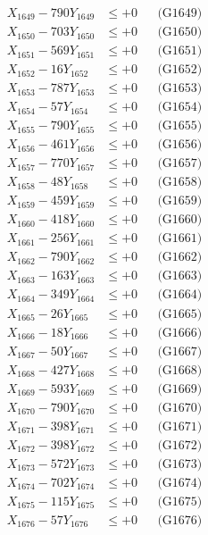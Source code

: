 \documentclass[a4paper,10pt]{article}
\begin{document}
{\begin{align}
X_{1649} - 790Y_{1649} &\leq +0 && \text{(G1649)} \\
X_{1650} - 703Y_{1650} &\leq +0 && \text{(G1650)} \\
\allowbreak
X_{1651} - 569Y_{1651} &\leq +0 && \text{(G1651)} \\
X_{1652} - 16Y_{1652} &\leq +0 && \text{(G1652)} \\
X_{1653} - 787Y_{1653} &\leq +0 && \text{(G1653)} \\
X_{1654} - 57Y_{1654} &\leq +0 && \text{(G1654)} \\
X_{1655} - 790Y_{1655} &\leq +0 && \text{(G1655)} \\
X_{1656} - 461Y_{1656} &\leq +0 && \text{(G1656)} \\
X_{1657} - 770Y_{1657} &\leq +0 && \text{(G1657)} \\
X_{1658} - 48Y_{1658} &\leq +0 && \text{(G1658)} \\
X_{1659} - 459Y_{1659} &\leq +0 && \text{(G1659)} \\
X_{1660} - 418Y_{1660} &\leq +0 && \text{(G1660)} \\
\allowbreak
X_{1661} - 256Y_{1661} &\leq +0 && \text{(G1661)} \\
X_{1662} - 790Y_{1662} &\leq +0 && \text{(G1662)} \\
X_{1663} - 163Y_{1663} &\leq +0 && \text{(G1663)} \\
X_{1664} - 349Y_{1664} &\leq +0 && \text{(G1664)} \\
X_{1665} - 26Y_{1665} &\leq +0 && \text{(G1665)} \\
X_{1666} - 18Y_{1666} &\leq +0 && \text{(G1666)} \\
X_{1667} - 50Y_{1667} &\leq +0 && \text{(G1667)} \\
X_{1668} - 427Y_{1668} &\leq +0 && \text{(G1668)} \\
X_{1669} - 593Y_{1669} &\leq +0 && \text{(G1669)} \\
X_{1670} - 790Y_{1670} &\leq +0 && \text{(G1670)} \\
\allowbreak
X_{1671} - 398Y_{1671} &\leq +0 && \text{(G1671)} \\
X_{1672} - 398Y_{1672} &\leq +0 && \text{(G1672)} \\
X_{1673} - 572Y_{1673} &\leq +0 && \text{(G1673)} \\
X_{1674} - 702Y_{1674} &\leq +0 && \text{(G1674)} \\
X_{1675} - 115Y_{1675} &\leq +0 && \text{(G1675)} \\
X_{1676} - 57Y_{1676} &\leq +0 && \text{(G1676)} \\

\end{align}}
\end{document}
